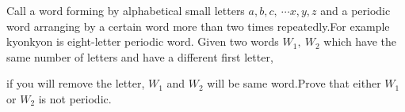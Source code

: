 Call a word  forming by alphabetical small letters $a,b,c,\ \cdots x,y,z$ and a periodic word arranging by a certain word more than two times repeatedly.For example kyonkyon is eight-letter periodic word. Given two words $W_1,\ W_2$ which have the same number of letters and have a different first letter,

if you will remove the letter, $W_1$ and $W_2$ will be same word.Prove that either $W_1$ or $W_2$ is not periodic.